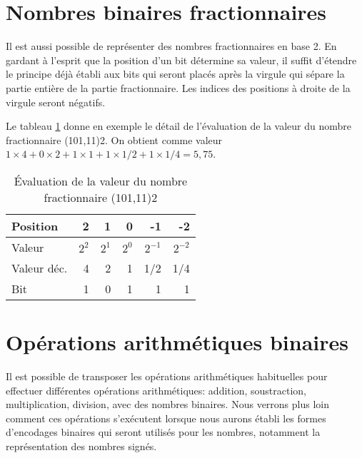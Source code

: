 \documentclass[letter, oneside]{book}
\begin{document}
\section{Nombres binaires fractionnaires}
\label{sec:orgab4a9bd}

Il est aussi possible de représenter des nombres fractionnaires en
base 2. En gardant à l'esprit que la position d'un bit détermine sa
valeur, il suffit d'étendre le principe déjà établi aux bits qui
seront placés après la virgule qui sépare la partie entière de la
partie fractionnaire. Les indices des positions à droite de la virgule
seront négatifs.

Le tableau \ref{tab:org94296cd} donne en exemple le détail de l'évaluation
de la valeur du nombre fractionnaire (101,11)2. On obtient comme
valeur \(1 \times 4 + 0 \times 2 + 1 \times 1 + 1 \times 1/2 + 1
\times 1/4 = 5,75\).

\begin{table}[htbp]
\caption{\label{tab:org94296cd}Évaluation de la valeur du nombre fractionnaire (101,11)2}
\centering
\begin{tabular}{lrrrrr}
Position & 2 & 1 & 0 & -1 & -2\\[0pt]
\hline
Valeur & \(2^2\) & \(2^1\) & \(2^0\) & \(2^{-1}\) & \(2^{-2}\)\\[0pt]
Valeur déc. & 4 & 2 & 1 & 1/2 & 1/4\\[0pt]
Bit & 1 & 0 & 1 & 1 & 1\\[0pt]
\end{tabular}
\end{table}

\section{Opérations arithmétiques binaires}
\label{sec:orge7b2963}

Il est possible de transposer les opérations arithmétiques habituelles
pour effectuer différentes opérations arithmétiques: addition,
soustraction, multiplication, division, avec des nombres
binaires. Nous verrons plus loin comment ces opérations s'exécutent
lorsque nous aurons établi les formes d'encodages binaires qui seront
utilisés pour les nombres, notamment la représentation des nombres
signés.
\end{document}

